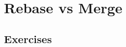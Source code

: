 \section{Rebase vs Merge}
\begin{frame}[fragile]
    \slidetitle
\end{frame}

\subsection{Exercises}
\begin{frame}[fragile]
  \subslidetitle
\end{frame}
